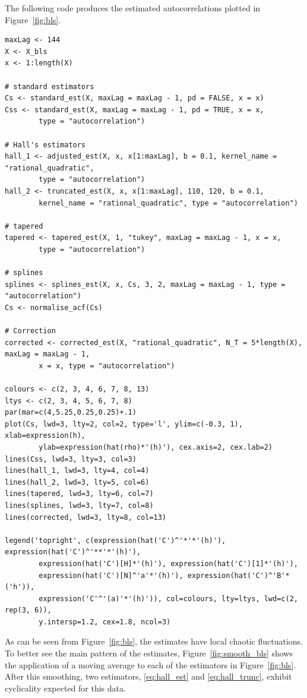 The following code produces the estimated autocorrelations plotted in
Figure~\ref{fig:bls}.

\begin{verbatim}
maxLag <- 144
X <- X_bls
x <- 1:length(X)

# standard estimators
Cs <- standard_est(X, maxLag = maxLag - 1, pd = FALSE, x = x)
Css <- standard_est(X, maxLag = maxLag - 1, pd = TRUE, x = x,
        type = "autocorrelation")

# Hall's estimators
hall_1 <- adjusted_est(X, x, x[1:maxLag], b = 0.1, kernel_name = "rational_quadratic",
        type = "autocorrelation")
hall_2 <- truncated_est(X, x, x[1:maxLag], 110, 120, b = 0.1,
        kernel_name = "rational_quadratic", type = "autocorrelation")

# tapered
tapered <- tapered_est(X, 1, "tukey", maxLag = maxLag - 1, x = x,
        type = "autocorrelation")

# splines
splines <- splines_est(X, x, Cs, 3, 2, maxLag = maxLag - 1, type = "autocorrelation")
Cs <- normalise_acf(Cs)

# Correction
corrected <- corrected_est(X, "rational_quadratic", N_T = 5*length(X), maxLag = maxLag - 1,
        x = x, type = "autocorrelation")

colours <- c(2, 3, 4, 6, 7, 8, 13)
ltys <- c(2, 3, 4, 5, 6, 7, 8)
par(mar=c(4,5.25,0.25,0.25)+.1)
plot(Cs, lwd=3, lty=2, col=2, type='l', ylim=c(-0.3, 1), xlab=expression(h),
        ylab=expression(hat(rho)*'(h)'), cex.axis=2, cex.lab=2)
lines(Css, lwd=3, lty=3, col=3)
lines(hall_1, lwd=3, lty=4, col=4)
lines(hall_2, lwd=3, lty=5, col=6)
lines(tapered, lwd=3, lty=6, col=7)
lines(splines, lwd=3, lty=7, col=8)
lines(corrected, lwd=3, lty=8, col=13)

legend('topright', c(expression(hat('C')^'*'*'(h)'), expression(hat('C')^'**'*'(h)'),
        expression(hat('C')[H]*'(h)'), expression(hat('C')[1]*'(h)'),
        expression(hat('C')[N]^'a'*'(h)'), expression(hat('C')^'B'*('h')),
        expression('C'^'(a)'*'(h)')), col=colours, lty=ltys, lwd=c(2, rep(3, 6)),
        y.intersp=1.2, cex=1.8, ncol=3)
\end{verbatim}

As can be seen from Figure~\ref{fig:bls}, the estimates have local
chaotic fluctuations. To better see the main pattern of the estimates,
Figure~\ref{fig:smooth_bls} shows the application of a moving average to
each of the estimators in Figure~\ref{fig:bls}. After this smoothing,
two estimators, \eqref{eq:hall_est} and \eqref{eq:hall_trunc}, exhibit
cyclicality expected for this data.

